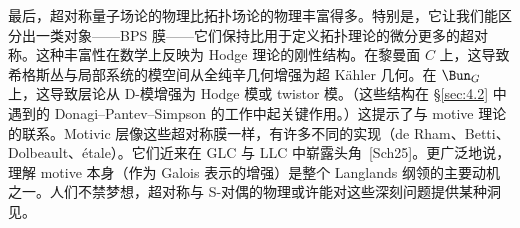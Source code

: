 最后，超对称量子场论的物理比拓扑场论的物理丰富得多。特别是，它让我们能区分出一类对象——BPS 膜——它们保持比用于定义拓扑理论的微分更多的超对称。这种丰富性在数学上反映为 Hodge 理论的刚性结构。在黎曼面 $C$ 上，这导致希格斯丛与局部系统的模空间从全纯辛几何增强为超 Kähler 几何。在 $\Bun_{G}$ 上，这导致层论从 D-模增强为 Hodge 模或 twistor 模。（这些结构在 \S\ref{sec:4.2} 中遇到的 Donagi–Pantev–Simpson 的工作中起关键作用。）这提示了与 motive 理论的联系。Motivic 层像这些超对称膜一样，有许多不同的实现（de Rham、Betti、Dolbeault、étale）。它们近来在 GLC 与 LLC 中崭露头角~[Sch25]。更广泛地说，理解 motive 本身（作为 Galois 表示的增强）是整个 Langlands 纲领的主要动机之一。人们不禁梦想，超对称与 S-对偶的物理或许能对这些深刻问题提供某种洞见。
